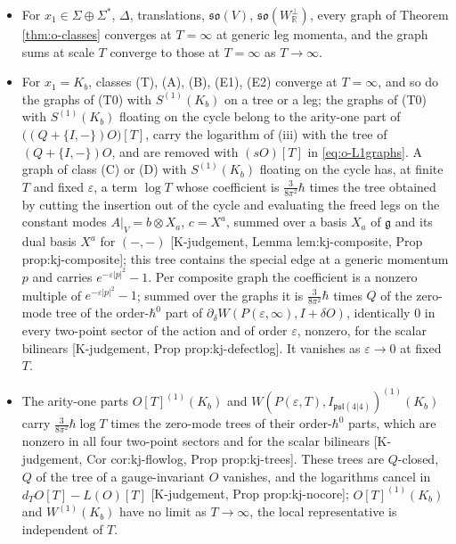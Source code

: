 \begin{theorem}
\label{thm:o-ir}
\begin{itemize}
\item[(i)] For $x_1\in\Sigma\oplus\Sigma^*$, $\Delta$, translations, $\mathfrak{so}(V)$, $\mathfrak{so}(W_{\mathbb R}^\perp)$, every graph of Theorem \ref{thm:o-classes} converges at $T=\infty$ at generic leg momenta, and the graph sums at scale $T$ converge to those at $T=\infty$ as $T\to\infty$.
\item[(ii)] For $x_1=K_b$, classes (T), (A), (B), (E1), (E2) converge at $T=\infty$, and so do the graphs of (T0) with $S^{(1)}(K_b)$ on a tree or a leg; the graphs of (T0) with $S^{(1)}(K_b)$ floating on the cycle belong to the arity-one part of $\big((Q+\{I,-\})O\big)[T]$, carry the logarithm of (iii) with the tree of $(Q+\{I,-\})O$, and are removed with $(sO)[T]$ in \eqref{eq:o-L1graphs}. A graph of class (C) or (D) with $S^{(1)}(K_b)$ floating on the cycle has, at finite $T$ and fixed $\varepsilon$, a term $\log T$ whose coefficient is $\tfrac{3}{8\pi^2}\hbar$ times the tree obtained by cutting the insertion out of the cycle and evaluating the freed legs on the constant modes $A|_V=b\otimes X_a$, $c=X^a$, summed over a basis $X_a$ of $\mathfrak g$ and its dual basis $X^a$ for $(-,-)$ [K-judgement, Lemma lem:kj-composite, Prop prop:kj-composite]; this tree contains the special edge at a generic momentum $p$ and carries $e^{-\varepsilon|p|^2}-1$. Per composite graph the coefficient is a nonzero multiple of $e^{-\varepsilon|p|^2}-1$; summed over the graphs it is $\tfrac{3}{8\pi^2}\hbar$ times $Q$ of the zero-mode tree of the order-$\hbar^0$ part of $\partial_\delta W(P(\varepsilon,\infty),I+\delta O)$, identically $0$ in every two-point sector of the action and of order $\varepsilon$, nonzero, for the scalar bilinears [K-judgement, Prop prop:kj-defectlog]. It vanishes as $\varepsilon\to0$ at fixed $T$.
\item[(iii)] The arity-one parts $O[T]^{(1)}(K_b)$ and $W(P(\varepsilon,T),I_{\mathfrak{psl}(4|4)})^{(1)}(K_b)$ carry $\tfrac{3}{8\pi^2}\hbar\log T$ times the zero-mode trees of their order-$\hbar^0$ parts, which are nonzero in all four two-point sectors and for the scalar bilinears [K-judgement, Cor cor:kj-flowlog, Prop prop:kj-trees]. These trees are $Q$-closed, $Q$ of the tree of a gauge-invariant $O$ vanishes, and the logarithms cancel in $d_TO[T]-L(O)[T]$ [K-judgement, Prop prop:kj-nocore]; $O[T]^{(1)}(K_b)$ and $W^{(1)}(K_b)$ have no limit as $T\to\infty$, the local representative is independent of $T$.

\end{itemize}
\end{theorem}
